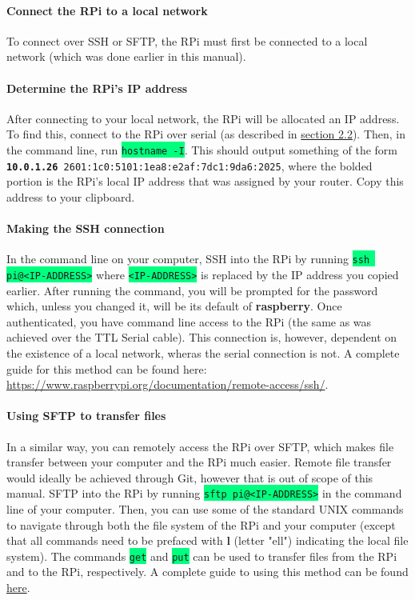 \documentclass{article}
\newcommand{\codei}[1]{\colorbox{SpringGreen}{\texttt{#1}}} %
\newcommand{\outputi}[1]{\colorbox{light-gray}{\texttt{#1}}} %
\newcommand{\red}[1]{\textcolor{BrickRed}{#1}} %
\begin{document}
    \paragraph{Connect the RPi to a local network}
    To connect over SSH or SFTP, the RPi must first be connected to a local network (which was done earlier in this manual).
    \paragraph{Determine the RPi's IP address}
    After connecting to your local network, the RPi will be allocated an IP address. To find this, connect to the RPi over serial (as described in \hyperref[sec:connect-serial]{section 2.2}). Then, in the command line, run \codei{hostname -I}. This should output something of the form \outputi{\red{\textbf{10.0.1.26} 2601:1c0:5101:1ea8:e2af:7dc1:9da6:2025}}, where the bolded portion is the RPi's local IP address that was assigned by your router. Copy this address to your clipboard.
    \paragraph{Making the SSH connection}
    In the command line on your computer, SSH into the RPi by running \codei{ssh pi@\red{<IP-ADDRESS>}} where \codei{\red{<IP-ADDRESS>}} is replaced by the IP address you copied earlier. After running the command, you will be prompted for the password which, unless you changed it, will be its default of \textbf{raspberry}. Once authenticated, you have command line access to the RPi (the same as was achieved over the TTL Serial cable). This connection is, however, dependent on the existence of a local network, wheras the serial connection is not. A complete guide for this method can be found here: \url{https://www.raspberrypi.org/documentation/remote-access/ssh/}.
    \paragraph{Using SFTP to transfer files}
    In a similar way, you can remotely access the RPi over SFTP, which makes file transfer between your computer and the RPi much easier. Remote file transfer would ideally be achieved through Git, however that is out of scope of this manual. SFTP into the RPi by running \codei{sftp pi@\red{<IP-ADDRESS>}} in the command line of your computer. Then, you can use some of the standard UNIX commands to navigate through both the file system of the RPi and your computer (except that all commands need to be prefaced with \textbf{l} (letter "ell") indicating the local file system). The commands \codei{get} and \codei{put} can be used to transfer files from the RPi and to the RPi, respectively. A complete guide to using this method can be found \href{https://www.digitalocean.com/community/tutorials/how-to-use-sftp-to-securely-transfer-files-with-a-remote-server}{here}.
\end{document}
